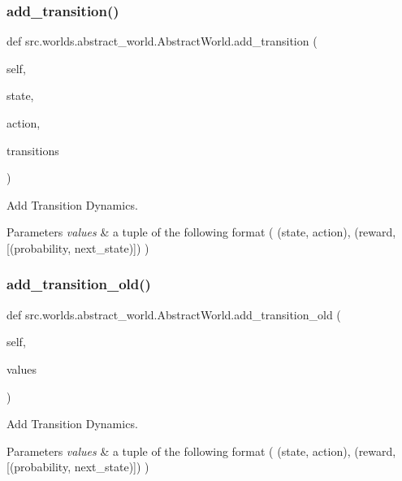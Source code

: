 \subsubsection{\texorpdfstring{add\+\_\+transition()}{add\_transition()}}
{\footnotesize\ttfamily def src.\+worlds.\+abstract\+\_\+world.\+Abstract\+World.\+add\+\_\+transition (\begin{DoxyParamCaption}\item[{}]{self,  }\item[{}]{state,  }\item[{}]{action,  }\item[{}]{transitions }\end{DoxyParamCaption})}



Add Transition Dynamics. 


\begin{DoxyParams}{Parameters}
{\em values} & a tuple of the following format ( (state, action), (reward, \mbox{[}(probability, next\+\_\+state)\mbox{]}) ) \\
\hline
\end{DoxyParams}
\mbox{\label{classsrc_1_1worlds_1_1abstract__world_1_1_abstract_world_a299f2aea5e9f19d70b84dc744621f41e}} 
\subsubsection{\texorpdfstring{add\+\_\+transition\+\_\+old()}{add\_transition\_old()}}
{\footnotesize\ttfamily def src.\+worlds.\+abstract\+\_\+world.\+Abstract\+World.\+add\+\_\+transition\+\_\+old (\begin{DoxyParamCaption}\item[{}]{self,  }\item[{}]{values }\end{DoxyParamCaption})}



Add Transition Dynamics. 


\begin{DoxyParams}{Parameters}
{\em values} & a tuple of the following format ( (state, action), (reward, \mbox{[}(probability, next\+\_\+state)\mbox{]}) ) \\
\hline
\end{DoxyParams}
\mbox{\label{classsrc_1_1worlds_1_1abstract__world_1_1_abstract_world_a177196a17a32460d8076eaffa643646b}} 
